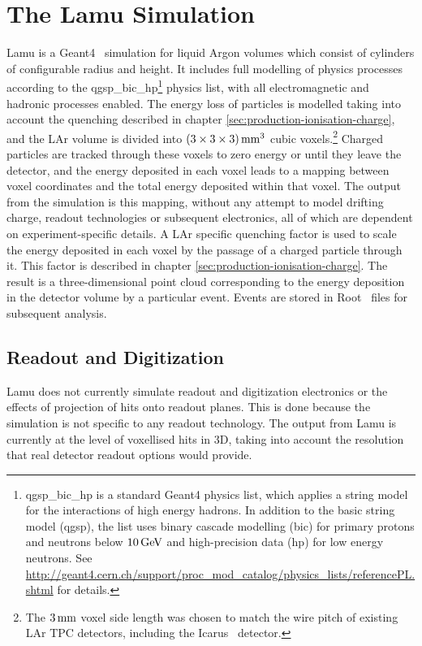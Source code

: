 \section{The Lamu Simulation}\label{sec:lamu}
Lamu is a Geant4~\citep{Geant4} simulation for liquid Argon volumes which consist of cylinders of configurable radius and height. It includes full modelling of physics processes according to the {\sc qgsp\_bic\_hp}\footnote{{\sc qgsp\_bic\_hp} is a standard Geant4 physics list, which applies a string model for the interactions of high energy hadrons. In addition to the basic string model ({\sc qgsp}), the list uses binary cascade modelling ({\sc bic}) for primary protons and neutrons below $10\,\mathrm{GeV}$ and high-precision data ({\sc hp}) for low energy neutrons. See \url{http://geant4.cern.ch/support/proc_mod_catalog/physics_lists/referencePL.shtml} for details.} physics list, with all electromagnetic and hadronic processes enabled. The energy loss of particles is modelled taking into account the quenching described in chapter \ref{sec:production-ionisation-charge}, and the \ac{LAr} volume is divided into $(3\times 3\times 3) \,\mathrm{mm}^3$ cubic voxels.\footnote{The $3\,\mathrm{mm}$ voxel side length was chosen to match the wire pitch of existing \acs{LAr TPC} detectors, including the Icarus~\citep{Amerio2004} detector.} Charged particles are tracked through these voxels to zero energy or until they leave the detector, and the energy deposited in each voxel leads to a mapping between voxel coordinates and the total energy deposited within that voxel. The output from the simulation is this mapping, without any attempt to model drifting charge, readout technologies or subsequent electronics, all of which are dependent on experiment-specific details. A \ac{LAr} specific quenching factor is used to scale the energy deposited in each voxel by the passage of a charged particle through it. This factor is described in chapter \ref{sec:production-ionisation-charge}. The result is a three-dimensional point cloud corresponding to the energy deposition in the detector volume by a particular event. Events are stored in {\sc Root}~\citep{Root} files for subsequent analysis.

\subsection{Readout and Digitization}
Lamu does not currently simulate readout and digitization electronics or the effects of projection of hits onto readout planes. This is done because the simulation is not specific to any readout technology. The output from Lamu is currently at the level of voxellised hits in 3D, taking into account the resolution that real detector readout options would provide.

